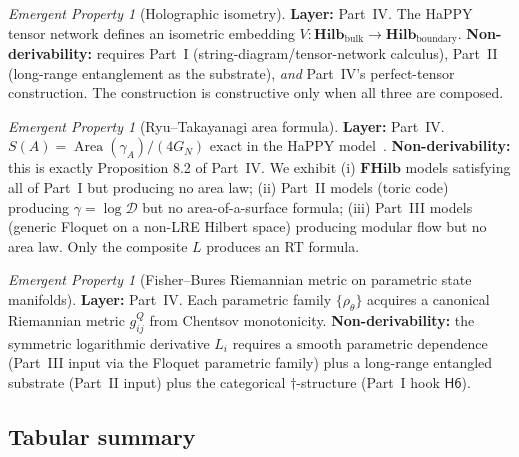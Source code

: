 \documentclass[12pt]{article}
\theoremstyle{definition}
\theoremstyle{remark}
\newtheorem{emerg}[theorem]{Emergent Property}
\newcommand{\Hilb}{\mathbf{Hilb}}
\newcommand{\FHilb}{\mathbf{FHilb}}
\newcommand{\Area}{\operatorname{Area}}
\begin{document}
\begin{emerg}[Holographic isometry]
\label{em:happy}
\textbf{Layer:} Part~IV. The HaPPY tensor network defines an isometric
embedding $V : \Hilb_{\mathrm{bulk}} \to \Hilb_{\mathrm{boundary}}$.
\textbf{Non-derivability:} requires Part~I (string-diagram/tensor-network
calculus), Part~II (long-range entanglement as the substrate), \emph{and}
Part~IV's perfect-tensor construction. The construction is constructive only
when all three are composed.
\end{emerg}

\begin{emerg}[Ryu--Takayanagi area formula]
\label{em:rt}
\textbf{Layer:} Part~IV. $S(A) = \Area(\gamma_A) / (4G_N)$ exact in the
HaPPY model~\cite{pyhp2015,harlow2017}. \textbf{Non-derivability:} this is
exactly Proposition 8.2 of Part~IV. We exhibit (i) $\FHilb$ models satisfying all of Part~I but
producing no area law; (ii) Part~II models (toric code) producing $\gamma
= \log \mathcal{D}$ but no area-of-a-surface formula; (iii) Part~III models
(generic Floquet on a non-LRE Hilbert space) producing modular flow but no
area law. Only the composite $L$ produces an RT formula.
\end{emerg}

\begin{emerg}[Fisher--Bures Riemannian metric on parametric state
  manifolds]
\label{em:fisher}
\textbf{Layer:} Part~IV. Each parametric family $\{\rho_\theta\}$ acquires a
canonical Riemannian metric $g_{ij}^Q$ from Chentsov monotonicity.
\textbf{Non-derivability:} the symmetric logarithmic derivative $L_i$
requires a smooth parametric dependence (Part~III input via the Floquet
parametric family) plus a long-range entangled substrate (Part~II input)
plus the categorical $\dagger$-structure (Part~I hook $\mathsf{H6}$).
\end{emerg}

\subsection{Tabular summary}
\end{document}
